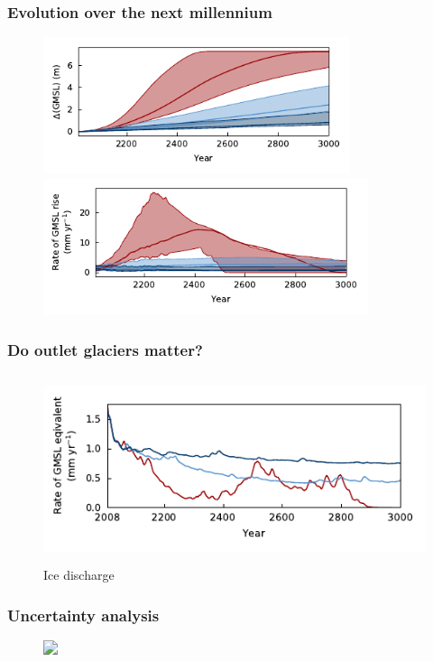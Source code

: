 \documentclass[hide notes,intlimits]{beamer}
\begin{document}
\begin{frame}
  \frametitle{Evolution over the next millennium}
  \begin{figure}
    \includegraphics[height=4cm]{les18_rcp_limnsw} \\
    \includegraphics[height=4cm]{les18_rcp_tendency_of_ice_mass_glacierized}
  \end{figure}
\end{frame}


\begin{frame}
  \frametitle{Do outlet glaciers matter?}
  \begin{figure}
    \includegraphics[height=5.5cm]{rcp_d_rcp_tendency_of_ice_mass_due_to_discharge}
    \caption{Ice discharge}
  \end{figure}
\end{frame}

\begin{frame}
  \frametitle{Uncertainty analysis}
  \begin{figure}
    \includegraphics<1>[width=\textwidth]{gcm_rcp_les}
  \end{figure}
\end{frame}
\end{document}
